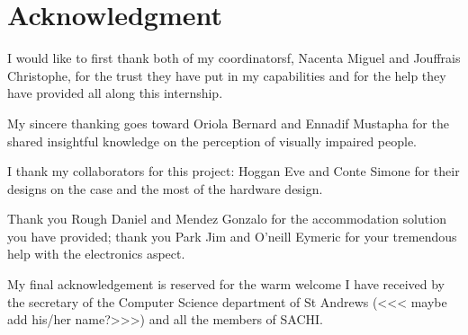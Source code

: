 \section*{Acknowledgment}

I would like to first thank both of my coordinatorsf, Nacenta Miguel and Jouffrais Christophe, for the trust they have put in my capabilities and for the help they have provided all along this internship.

My sincere thanking goes toward Oriola Bernard and Ennadif Mustapha for the shared insightful knowledge on the perception of visually impaired people.

I thank my collaborators for this project: Hoggan Eve and Conte Simone for their designs on the case and the most of the hardware design.

Thank you Rough Daniel and Mendez Gonzalo for the accommodation solution you have provided; thank you Park Jim and O'neill Eymeric for your tremendous help with the electronics aspect.

My final acknowledgement is reserved for the warm welcome I have received by the secretary of the Computer Science department of St Andrews (<<< maybe add his/her name?>>>) and all the members of SACHI.
